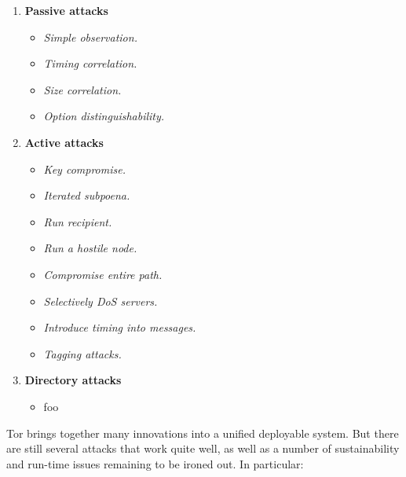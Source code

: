 \documentclass[times,10pt,twocolumn]{article}
\begin{document}
\begin{enumerate}
\item \textbf{Passive attacks}
\begin{itemize}
\item \emph{Simple observation.}
\item \emph{Timing correlation.}
\item \emph{Size correlation.}
\item \emph{Option distinguishability.}
\end{itemize}

\item \textbf{Active attacks}
\begin{itemize}
\item \emph{Key compromise.}
\item \emph{Iterated subpoena.}
\item \emph{Run recipient.}
\item \emph{Run a hostile node.}
\item \emph{Compromise entire path.}
\item \emph{Selectively DoS servers.}
\item \emph{Introduce timing into messages.}
\item \emph{Tagging attacks.}
\end{itemize}

\item \textbf{Directory attacks}
\begin{itemize}
\item foo
\end{itemize}

\end{enumerate}


\label{sec:conclusion}

Tor brings together many innovations into
a unified deployable system. But there are still several attacks that
work quite well, as well as a number of sustainability and run-time
issues remaining to be ironed out. In particular:
\end{document}
